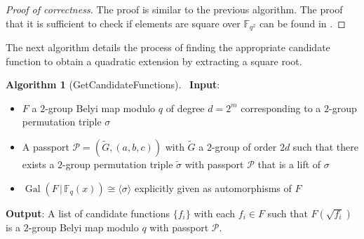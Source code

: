\documentclass{dcthesis}
\newcommand{\mm}[1]{{\color{blue} \sf MM: [#1]}}
\newcommand{\wt}[1]{\widetilde{#1}}
\newcommand{\FFqal}{{\mathbb F}_q^{\textup{al}}}
\newcommand{\FF}{\mathbb{F}}
\DeclareMathOperator{\Gal}{Gal}
\numberwithin{equation}{section}
\newtheorem{lemma}[equation]{Lemma}
\theoremstyle{definition}
\newtheorem{alg}[equation]{Algorithm}
\theoremstyle{remark}
\begin{document}
{{{\begin{proof}[Proof of correctness]
      The proof is similar to the previous
      algorithm.
      The proof that
      it is sufficient to check if
      elements are square
      over $\FF_{q^2}$
      can be found in
      \cite[Corollary 3.7.4]{stick}.
    \end{proof}
    The next algorithm details the process
    of finding
    the appropriate
    candidate function to obtain
    a quadratic extension by extracting
    a square root.
    \begin{alg}[GetCandidateFunctions]
      \label{alg:getcandidates}
      \,
      \newline
      \textbf{Input}:
      \begin{itemize}
        \item 
          $F$
          a $2$-group Belyi map modulo $q$
          of degree $d=2^m$
          corresponding to a $2$-group
          permutation triple $\sigma$
        \item
          A passport
          $\mathcal{P}=(\wt{G},(a,b,c))$
          with $\wt{G}$ a $2$-group of order
          $2d$ such that there
          exists a
          $2$-group permutation triple
          $\wt{\sigma}$ with passport
          $\mathcal{P}$
          that is a lift of
          $\sigma$
        \item
          $\Gal(F\,|\,\FF_q(x))\cong
          \langle\sigma\rangle$
          explicitly given
          as automorphisms of $F$
      \end{itemize}
      \textbf{Output}:
      A list of candidate functions
      $\{f_i\}$ with each $f_i\in F$
      such that $F(\sqrt{f_i})$ is a
      $2$-group Belyi map modulo $q$
      with passport $\mathcal{P}$.

\end{alg}}}}
\end{document}
